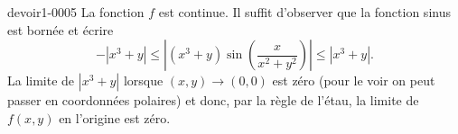 \begin{corrige}{devoir1-0005}
La fonction $f$ est continue. Il suffit d'observer que la fonction sinus est bornée et écrire
\begin{equation}
 -|x^3+y|\leq \left\vert(x^3+y)\sin\left(\frac{x}{x^2+y^2}\right)\right\vert\leq |x^3+y|.
\end{equation}
La limite de $|x^3+y|$ lorsque $(x,y)\to (0,0)$ est zéro (pour le voir on peut passer en coordonnées polaires) et donc, par la règle  de l'étau, la limite de $f(x,y)$ en l'origine est zéro.  

\end{corrige}
